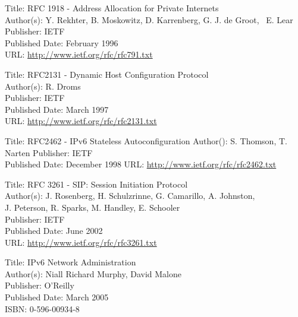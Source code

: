 \documentclass[a4paper,12pt]{article}
\begin{document}
Title: RFC 1918 - Address Allocation for Private Internets \\
Author(s): Y. Rekhter, B. Moskowitz, D. Karrenberg, G. J. de Groot, \
\indent E. Lear \\
Publisher: IETF \\
Published Date: February 1996  \\
URL: \url{http://www.ietf.org/rfc/rfc791.txt}	 

Title: RFC2131 - Dynamic Host Configuration Protocol \\
Author(s): R. Droms \\
Publisher: IETF \\
Published Date: March 1997 \\
URL: \url{http://www.ietf.org/rfc/rfc2131.txt}	 

Title: RFC2462 - IPv6 Stateless Autoconfiguration
Author(): S. Thomson, T. Narten
Publisher: IETF \\
Published Date: December 1998
URL: \url{http://www.ietf.org/rfc/rfc2462.txt}	 

Title: RFC 3261 - SIP: Session Initiation Protocol \\
Author(s): J. Rosenberg, H. Schulzrinne, G. Camarillo, A. Johnston, \\
\indent J. Peterson, R. Sparks, M. Handley, E. Schooler \\
Publisher: IETF \\
Published Date: June 2002  \\
URL: \url{http://www.ietf.org/rfc/rfc3261.txt}	 

Title: IPv6 Network Administration \\
Author(s): Niall Richard Murphy, David Malone \\
Publisher: O'Reilly \\
Published Date: March 2005  \\
ISBN: 0-596-00934-8	 
\end{document}
